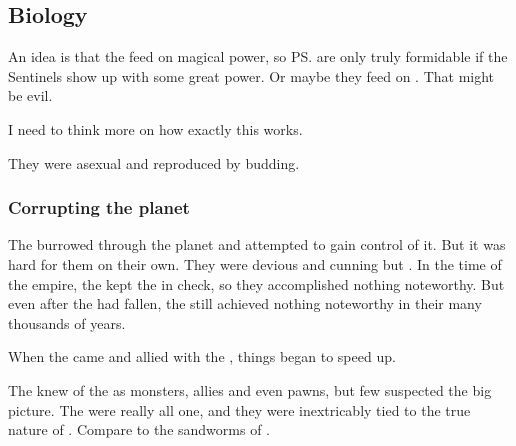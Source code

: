 









\subsection{Biology}
An idea is that the \noggyaleth{} feed on magical power, so \ps{\Teshrial} \noggyaleth{} are only truly formidable if the Sentinels show up with some great power. Or maybe they feed on \vertices. That might be evil. 

I need to think more on how exactly this works. 

They were asexual and reproduced by budding.





\subsubsection{Corrupting the planet}
The \noggyaleth burrowed through the planet and attempted to gain control of it.
But it was hard for them on their own.
They were devious and cunning but .
In the time of the \ophidian empire, the \ophidians kept the \noggyaleth in check, so they accomplished nothing noteworthy. 
But even after the \ophidians had fallen, the \noggyaleth still achieved nothing noteworthy in their many thousands of years. 

When the \resphain came and allied with the \noggyaleth, things began to speed up. 

The \resphain knew of the \noggyaleth as monsters, allies and even pawns, but few suspected the big picture.
The \noggyaleth were really all one, and they were inextricably tied to the true nature of \Miith.
Compare to the sandworms of \cite{FrankHerbert:Dune}. 

